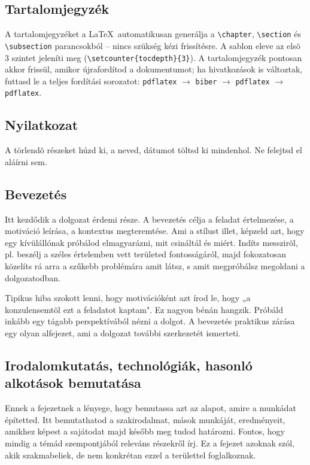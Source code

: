 \documentclass{sapientia-thesis}
\begin{document}
\subsection{Tartalomjegyzék}
A tartalomjegyzéket a \LaTeX\ automatikusan generálja a \verb|\chapter|, \verb|\section| és \verb|\subsection| parancsokból -- nincs szükség kézi frissítésre. A sablon eleve az elsõ 3 szintet jeleníti meg (\verb|\setcounter{tocdepth}{3}|). A tartalomjegyzék pontosan akkor frissül, amikor újrafordítod a dokumentumot; ha hivatkozások is változtak, futtasd le a teljes fordítási sorozatot: \texttt{pdflatex} $\to$ \texttt{biber} $\to$ \texttt{pdflatex} $\to$ \texttt{pdflatex}.

\subsection{Nyilatkozat}
A törlendõ részeket húzd ki, a neved, dátumot töltsd ki mindenhol. Ne felejtsd el aláírni sem.

\subsection{Bevezetés}
Itt kezdődik a dolgozat érdemi része. A bevezetés célja a feladat értelmezése, a motiváció leírása, a kontextus megteremtése. Ami a stílust illet, képzeld azt, hogy egy kívülállónak próbálod elmagyarázni, mit csináltál és miért. Indíts messzirõl, pl. beszélj a széles értelemben vett területed fontosságáról, majd fokozatosan közelíts rá arra a szűkebb problémára amit látsz, s amit megpróbálsz megoldani a dolgozatodban.

Tipikus hiba szokott lenni, hogy motivációként azt írod le, hogy „a konzulensemtõl ezt a feladatot kaptam". Ez nagyon bénán hangzik. Próbáld inkább egy tágabb perspektívából nézni a dolgot. A bevezetés praktikus zárása egy olyan alfejezet, ami a dolgozat további szerkezetét ismerteti.

\subsection{Irodalomkutatás, technológiák, hasonló alkotások bemutatása}
Ennek a fejezetnek a lényege, hogy bemutassa azt az alapot, amire a munkádat építetted. Itt bemutathatod a szakirodalmat, mások munkáját, eredményeit, amikhez képest a sajátodat majd később meg tudod határozni. Fontos, hogy mindig a témád szempontjából releváns részekről írj. Ez a fejezet azoknak szól, akik szakmabeliek, de nem konkrétan ezzel a területtel foglalkoznak.
\end{document}
